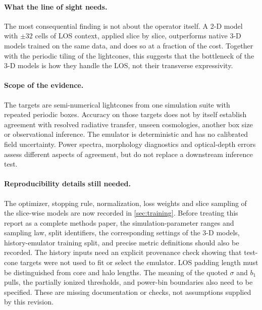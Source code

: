 \paragraph{What the line of sight needs.} The most consequential finding is not about the operator itself. A 2-D model with $\pm32$ cells of LOS context, applied slice by slice, outperforms native 3-D models trained on the same data, and does so at a fraction of the cost. Together with the periodic tiling of the lightcones, this suggests that the bottleneck of the 3-D models is how they handle the LOS, not their transverse expressivity.

\paragraph{Scope of the evidence.} The targets are semi-numerical lightcones from one simulation suite with repeated periodic boxes. Accuracy on those targets does not by itself establish agreement with resolved radiative transfer, unseen cosmologies, another box size or observational inference. The emulator is deterministic and has no calibrated field uncertainty. Power spectra, morphology diagnostics and optical-depth errors assess different aspects of agreement, but do not replace a downstream inference test.

\paragraph{Reproducibility details still needed.} The optimizer, stopping rule, normalization, loss weights and slice sampling of the slice-wise models are now recorded in \cref{sec:training}. Before treating this report as a complete methods paper, the simulation-parameter ranges and sampling law, split identifiers, the corresponding settings of the 3-D models, history-emulator training split, and precise metric definitions should also be recorded. The history inputs need an explicit provenance check showing that test-cone targets were not used to fit or select the emulator. LOS padding length must be distinguished from core and halo lengths. The meaning of the quoted $\sigma$ and $b_1$ pulls, the partially ionized thresholds, and power-bin boundaries also need to be specified. These are missing documentation or checks, not assumptions supplied by this revision.



